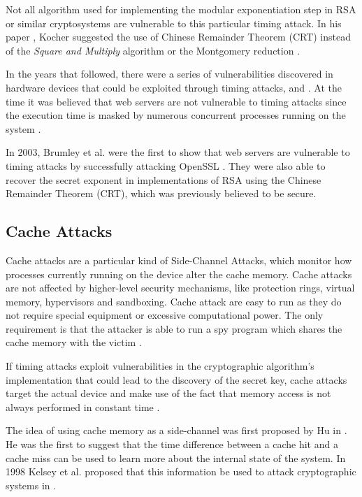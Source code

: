 \documentclass[10pt,a4paper,twoside]{book}
\begin{document}
Not all algorithm used for implementing the modular exponentiation step in RSA or similar cryptosystems are vulnerable to this particular timing attack. In his paper \cite{kocher1996timing}, Kocher suggested the use of Chinese Remainder Theorem (CRT) instead of the \textit{Square and Multiply} algorithm or the Montgomery reduction \cite{montgomery1985modular}.

In the years that followed, there were a series of vulnerabilities discovered in hardware devices that could be exploited through timing attacks, \cite{dhem1998practical} and \cite{schindler2000timing}. At the time it was believed that web servers are not vulnerable to timing attacks since the execution time is masked by numerous concurrent processes running on the system \cite{brumley2005remote}.

In 2003, Brumley et al. \cite{brumley2005remote} were the first to show that web servers are vulnerable to timing attacks by successfully attacking OpenSSL \cite{openssl}. They were also able to recover the secret exponent in implementations of RSA using the Chinese Remainder Theorem (CRT), which was previously believed to be secure. 

\subsection{Cache Attacks}
Cache attacks are a particular kind of Side-Channel Attacks, which monitor how processes currently running on the device alter the cache memory. Cache attacks are not affected by higher-level security mechanisms, like protection rings, virtual memory, hypervisors and sandboxing. Cache attack are easy to run as they do not require special equipment or excessive computational power. The only requirement is that the attacker is able to run a spy program which shares the cache memory with the victim \cite{oren2015spy}.

If timing attacks exploit vulnerabilities in the cryptographic algorithm's implementation that could lead to the discovery of the secret key, cache attacks target the actual device and make use of the fact that memory access is not always performed in constant time \cite{canteaut2006understanding}.

The idea of using cache memory as a side-channel was first proposed by Hu in \cite{hu1992lattice}. He was the first to suggest that the time difference between a cache hit and a cache miss can be used to learn more about the internal state of the system. In 1998 Kelsey et al. proposed that this information be used to attack cryptographic systems in \cite{kelsey1998side}. 
\end{document}
